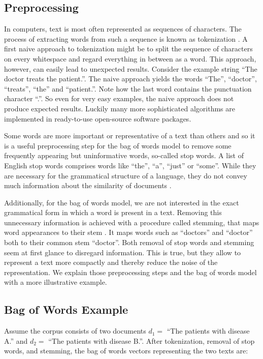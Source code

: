 \subsection*{Preprocessing}
In computers, text is most often represented as sequences of characters. The process of extracting words from such a sequence is known as tokenization \citep{Manning2008prepr}. A first naive approach to tokenization might be to
split the sequence of characters on every whitespace and regard everything
in between as a word. This approach, however, can easily lead to unexpected
results. Consider the example string ``The doctor treats the patient.''. The naive
approach yields the words ``The'', ``doctor'', ``treats'', ``the'' and ``patient.''.
Note how the last word contains the punctuation character ``.''.
So even for very easy examples, the naive approach does not produce
expected results. Luckily many more sophisticated algorithms are implemented
in ready-to-use open-source software packages.

Some words are more important or representative of a text than others and so it is a useful preprocessing step for the bag of words model to remove some frequently appearing but uninformative words, so-called stop words. A list of English stop words comprises words like ``the'', ``a'', ``just'' or ``some''.  While they are necessary for the
grammatical structure of a language, they do not convey much information
about the similarity of documents \citep{Manning2008prepr}.

Additionally, for the bag of words model, we are not interested in the exact grammatical form in which a word is present in a text. Removing this unnecessary information is achieved with a procedure called stemming, that maps word appearances to their stem \citep{Manning2008prepr}. It maps words such as ``doctors'' and ``doctor'' both to their common stem ``doctor''. Both removal of stop words and stemming seem at first glance to disregard information. This is true, but they allow to represent a text more compactly and thereby reduce the noise of the representation. We explain those preprocessing steps and the bag of words model with a more illustrative example.

\subsection*{Bag of Words Example}
Assume the corpus consists of two documents $d_{1}=$ ``The patients with disease A.'' and $d_{2}=$ ``The patients with disease B.''. After tokenization, removal of stop words, and stemming, the bag of words vectors representing the two texts are:

